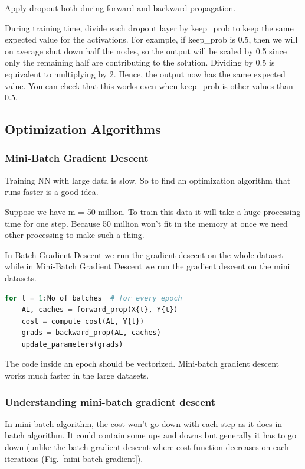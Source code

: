 Apply dropout both during forward and backward propagation.

During training time, divide each dropout layer by keep\_prob to keep the same expected value for the activations. For example, if keep\_prob is 0.5, then we will on average shut down half the nodes, so the output will be scaled by 0.5 since only the remaining half are contributing to the solution. Dividing by 0.5 is equivalent to multiplying by 2. Hence, the output now has the same expected value. You can check that this works even when keep\_prob is other values than 0.5.

\newpage

\subsection{Optimization Algorithms}

\subsubsection{Mini-Batch Gradient Descent}
Training NN with large data is slow. So to find an optimization algorithm that runs faster is a good idea.

Suppose we have m = 50 million. To train this data it will take a huge processing time for one step. Because 50 million won't fit in the memory at once we need other processing to make such a thing.

In Batch Gradient Descent we run the gradient descent on the whole dataset while in Mini-Batch Gradient Descent we run the gradient descent on the mini datasets.

\begin{lstlisting}[language=python]
for t = 1:No_of_batches  # for every epoch
	AL, caches = forward_prop(X{t}, Y{t})
	cost = compute_cost(AL, Y{t})
	grads = backward_prop(AL, caches)
	update_parameters(grads)
\end{lstlisting}

The code inside an epoch should be vectorized. Mini-batch gradient descent works much faster in the large datasets.

\subsubsection{Understanding mini-batch gradient descent}
In mini-batch algorithm, the cost won't go down with each step as it does in batch algorithm. It could contain some ups and downs but generally it has to go down (unlike the batch gradient descent where cost function decreases on each iterations (Fig. \ref{mini-batch-gradient}).

